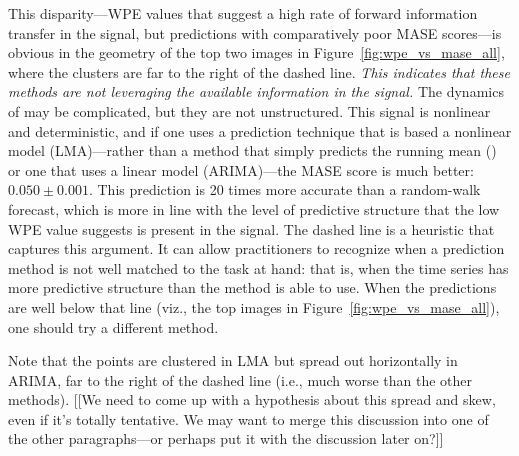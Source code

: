 This disparity---WPE values that suggest a high rate of forward
information transfer in the signal, but predictions with comparatively
poor MASE scores---is obvious in the geometry of the top two images in
Figure~\ref{fig:wpe_vs_mase_all}, where the \col clusters are far to
the right of the dashed line.  {\sl This indicates that these methods
  are not leveraging the available information in the signal.}  The
dynamics of \col may be complicated, but they are not unstructured.
This signal is nonlinear and deterministic, and if one uses a
prediction technique that is based a nonlinear model (LMA)---rather
than a method that simply predicts the running mean (\naive) or one
that uses a linear model (ARIMA)---the MASE score is much better:
$0.050 \pm 0.001$.  This prediction is 20 times more accurate than a
random-walk forecast, which is more in line with the level of
predictive structure that the low WPE value suggests is present in the
signal.  The dashed line is a heuristic that captures this argument.
It can allow practitioners to recognize when a prediction method is
not well matched to the task at hand: that is, when the time series
has more predictive structure than the method is able to use.  When
the predictions are well below that line (viz., the top images in
Figure~\ref{fig:wpe_vs_mase_all}), one should try a different method.

Note that the \col points are clustered in LMA but spread out
horizontally in ARIMA, far to the right of the dashed line (i.e., much
worse than the other methods).  {\color{red}[[We need to come up with a hypothesis
    about this spread and skew, even if it's totally tentative.  We
    may want to merge this discussion into one of the other \col
    paragraphs---or perhaps put it with the \svdone discussion later
    on?]]}

